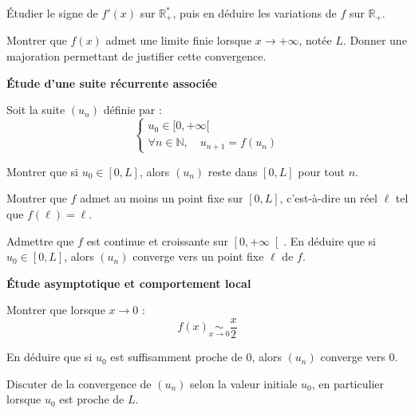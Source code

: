 \documentclass[10pt,a4paper]{article}
\begin{document}
\q Étudier le signe de \( f'(x) \) sur \( \mathbb{R}_+^* \), puis en déduire les variations de \( f
\) sur \( \mathbb{R}_+ \).

\q Montrer que \( f(x) \) admet une limite finie lorsque \( x \to +\infty \), notée \( L
\). Donner une majoration permettant de justifier cette convergence.

\vspace{0.5cm}

\textbf{Étude d'une suite récurrente associée}

Soit la suite \( (u_n) \) définie par :
\[
\begin{cases}
    u_0 \in [0, +\infty[ \\
    \forall n \in \mathbb{N}, \quad u_{n+1} = f(u_n)
\end{cases}
\]

\q Montrer que si \( u_0 \in [0, L] \), alors \( (u_n) \) reste dans \( [0, L] \) pour tout \( n \).

\q Montrer que \( f \) admet au moins un point fixe sur \( [0, L] \), c'est-à-dire un réel \( \ell
\) tel que \( f(\ell) = \ell \).

\q Admettre que \( f \) est continue et croissante sur \( \left[0, +\infty \right[ \). En déduire
que si \( u_0 \in [0, L] \), alors \( (u_n) \) converge vers un point fixe \( \ell \) de \( f \).

\vspace{0.5cm}

\textbf{Étude asymptotique et comportement local}

\q Montrer que lorsque \( x \to 0 \) :
\[
f(x) \mathop{\sim}\limits_{ x \to 0 } \frac{x}{2}
\]

\q En déduire que si \( u_0 \) est suffisamment proche de 0, alors \( (u_n) \) converge vers 0.

\q Discuter de la convergence de \( (u_n) \) selon la valeur initiale \( u_0 \), en particulier
lorsque \( u_0 \) est proche de \( L \).
\end{document}
